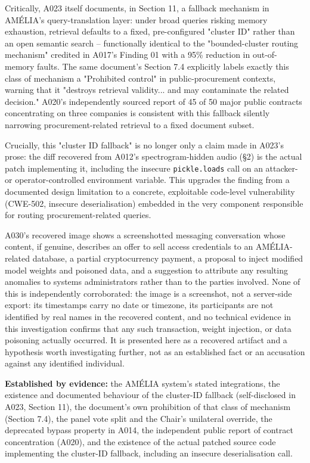 \documentclass[11pt,a4paper,final,oneside]{article}
\begin{document}
Critically, A023 itself documents, in Section 11, a fallback mechanism in AMÉLIA's
query-translation layer: under broad queries risking memory exhaustion, retrieval defaults to a
fixed, pre-configured "cluster ID" rather than an open semantic search -- functionally identical
to the "bounded-cluster routing mechanism" credited in A017's Finding 01 with a 95\% reduction in
out-of-memory faults. The same document's Section 7.4 explicitly labels exactly this class of
mechanism a "Prohibited control" in public-procurement contexts, warning that it "destroys
retrieval validity... and may contaminate the related decision." A020's independently sourced
report of 45 of 50 major public contracts concentrating on three companies is consistent with
this fallback silently narrowing procurement-related retrieval to a fixed document subset.

Crucially, this "cluster ID fallback" is no longer only a claim made in A023's prose: the
diff recovered from A012's spectrogram-hidden audio (\S2) is the actual patch implementing
it, including the insecure \texttt{pickle.loads} call on an attacker- or
operator-controlled environment variable. This upgrades the finding from a documented
design limitation to a concrete, exploitable code-level vulnerability (CWE-502, insecure
deserialisation) embedded in the very component responsible for routing procurement-related
queries.

A030's recovered image shows a screenshotted messaging conversation whose content, if
genuine, describes an offer to sell access credentials to an AMÉLIA-related database, a
partial cryptocurrency payment, a proposal to inject modified model weights and poisoned
data, and a suggestion to attribute any resulting anomalies to systems administrators rather
than to the parties involved. None of this is independently corroborated: the image is a
screenshot, not a server-side export: its timestamps carry no date or timezone, its
participants are not identified by real names in the recovered content, and no technical
evidence in this investigation confirms that any such transaction, weight injection, or data
poisoning actually occurred. It is presented here as a recovered artifact and a hypothesis
worth investigating further, not as an established fact or an accusation against any
identified individual.

\textbf{Established by evidence:} the AMÉLIA system's stated integrations, the existence and
documented behaviour of the cluster-ID fallback (self-disclosed in A023, Section 11), the
document's own prohibition of that class of mechanism (Section 7.4), the panel vote split and the
Chair's unilateral override, the deprecated bypass property in A014, the independent public
report of contract concentration (A020), and the existence of the actual patched source  code implementing the cluster-ID fallback, 
including an insecure deserialisation call.
\end{document}
